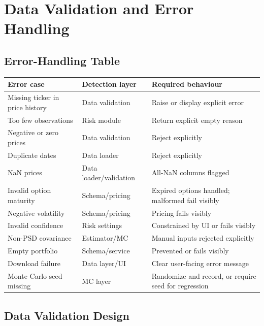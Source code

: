 \documentclass[11pt]{article}
\begin{document}
\section{Data Validation and Error Handling}

\subsection{Error-Handling Table}

\begin{center}
\begin{tabular}{L{4.5cm}L{3.5cm}L{5.5cm}}
\toprule
\textbf{Error case} & \textbf{Detection layer} & \textbf{Required behaviour} \\
\midrule
Missing ticker in price history  & Data validation & Raise or display explicit error \\
Too few observations             & Risk module & Return explicit empty reason \\
Negative or zero prices          & Data validation & Reject explicitly \\
Duplicate dates                  & Data loader & Reject explicitly \\
NaN prices                       & Data loader/validation & All-NaN columns flagged \\
Invalid option maturity          & Schema/pricing & Expired options handled; malformed fail visibly \\
Negative volatility              & Schema/pricing & Pricing fails visibly \\
Invalid confidence               & Risk settings & Constrained by UI or fails visibly \\
Non-PSD covariance               & Estimator/MC & Manual inputs rejected explicitly \\
Empty portfolio                  & Schema/service & Prevented or fails visibly \\
Download failure                 & Data layer/UI & Clear user-facing error message \\
Monte Carlo seed missing         & MC layer & Randomize and record, or require seed for regression \\
\bottomrule
\end{tabular}
\end{center}

\subsection{Data Validation Design}
\end{document}
